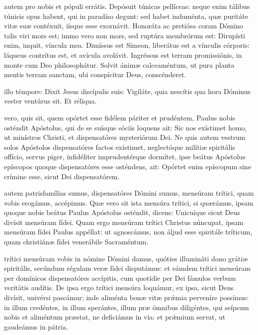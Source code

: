 \documentclass[fontsize=9pt,paper=A6,twoside,BCOR=1mm,DIV=22,headinclude]{scrarticle}
\begin{document}
\begin{multicols}{2}
{\RVCPv 

 autem pro nobis et pópuli errátis. Depósuit túnicas pellíceas: neque enim tálibus túnicis opus habent, qui in paradíso degunt: sed habet induménta, quæ puritáte vitæ suæ contéxuit, iísque sese exornávit. Honoráta ac pretiósa coram Dómino talis viri mors est; immo vero non mors, sed ruptúra membrórum est: Dirupísti enim, inquit, víncula mea. Dimíssus est Símeon, liberátus est a vínculis córporis: láqueus contrítus est, et avícula avolávit. Ingréssus est terram promissiónis, in monte cum Deo philosophátur. Solvit ánimæ calceaméntum, ut pura planta mentis terram sanctam, ubi conspícitur Deus, conscénderet.

\RVCPvi 

 illo témpore: Dixit Jesus discípulis suis: Vigiláte, quia nescítis qua hora Dóminus vester ventúrus sit. Et réliqua.

 vero, quis sit, quem opórtet esse fidélem páriter et prudéntem, Paulus nobis osténdit Apóstolus, qui de se suísque sóciis loquens ait: Sic nos exístimet homo, ut minístros Christi, et dispensatóres mysteriórum Dei. Ne quis autem vestrum solos Apóstolos dispensatóres factos exístimet, neglectóque milítiæ spiritális offício, servus piger, infidéliter imprudentérque dormítet, ipse beátus Apóstolus epíscopos quoque dispensatóres esse osténdens, ait: Opórtet enim epíscopum sine crímine esse, sicut Dei dispensatórem.

\RVCPvii 

 autem patrisfamílias sumus, dispensatóres Dómini sumus, mensúram trítici, quam vobis erogámus, accépimus. Quæ vero sit ista mensúra trítici, si quærámus, ipsam quoque nobis beátus Paulus Apóstolus osténdit, dicens:
Unicuíque sicut Deus divísit mensúram fídei. Quam ergo mensúram trítici Christus núncupat, ipsam mensúram fídei Paulus appéllat: ut agnoscámus, non áljud esse spiritále tríticum, quam christiánæ fídei venerábile Sacraméntum.

\RVCPviii 

 trítici mensúram vobis in nómine Dómini damus, quóties illumináti dono grátiæ spiritális, secúndum régulam veræ fídei disputámus: et eámdem trítici mensúram per domínicos dispensatóres accípitis, cum quotídie per Dei fámulos verbum veritátis audítis. De ipsa ergo trítici mensúra loquámur, ex ipsa, sicut Deus divísit, univérsi pascámur; inde aliménta bonæ vitæ pr\'æmia perveníre possímus: in illum credéntes, in illum sperántes, illum præ ómnibus diligéntes, qui seípsum nobis et aliméntum præstat, ne deficiámus in via: et pr\'æmium servat, ut gaudeámus in pátria.

}
\end{multicols}
\end{document}
